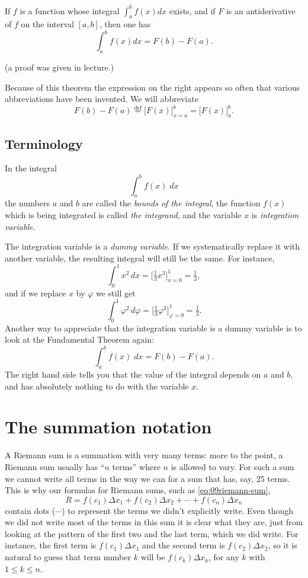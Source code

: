 \begin{theorem}
  If $f$ is a function whose integral $\int_a^b f(x) dx$ exists, and if
  $F$ is an antiderivative of $f$ on the interval $[a,b]$, then one has
  \begin{equation}
    \label{eq:fundamental-theorem}
    \int_a^b f(x) dx = F(b) - F(a).
  \end{equation}
\end{theorem}
(a proof was given in lecture.)

Because of this theorem the expression on the right appears so often
that various abbreviations have been invented.  We will abbreviate
\[
F(b)-F(a) \stackrel{\text{def}}{=} \bigl[F(x)\bigr]_{x=a}^b =
\bigl[F(x)\bigr]_a^b .
\]

\subsection{Terminology}\label{sec:08terminology}
In the integral
\[
\int_a^b f(x)\;dx
\]
the numbers $a$ and $b$ are called the \textit{bounds of the integral}, the
function $f(x)$ which is being integrated is called \textit{the integrand}, and
the variable $x$ is \textit{integration variable.}

The integration variable is a \textit{dummy variable}.  If we
systematically replace it with another variable, the resulting
integral will still be the same. For instance,
\[
\int_0^1 x^2\,dx = \bigl[\tfrac13 x^3\bigr]_{x=0}^1 = \tfrac13,
\]
and if we replace $x$ by $\varphi$ we still get
\[
\int_0^1 \varphi^2\, d\varphi
= \bigl[\tfrac13 \varphi^3\bigr]_{\varphi=0}^1 = \tfrac13.
\]
Another way to appreciate that the integration variable is a dummy
variable is to look at the Fundamental Theorem again:
\[
\int_a^b f(x)\;dx = F(b) -F(a).
\]
The right hand side tells you that the value of the integral depends
on $a$ and $b$, and has absolutely nothing to do with the variable $x$.

\section{The summation notation}
\label{sec:09about-those-dots}
A Riemann sum is a summation with very many terms: more to the point, a Riemann
sum usually has ``$n$ terms'' where $n$ is allowed to vary.  For such a sum we
cannot write all terms in the way we can for a sum that has, say, 25 terms.
This is why our formulas for Riemann sums, such as \eqref{eq:09riemann-sum},
\[
  R = f(c_1)\Delta x_1 + f(c_2) \Delta x_2 + \cdots + f(c_n)\Delta x_n
\]
contain dots ($\cdots$) to represent the terms we didn't explicitly write.
Even though we did not write most of the terms in this sum it is clear what they
are, just from looking at the pattern of the first two and the last term, which
we did write.  For instance, the first term is $f(c_1)\Delta x_1$ and the second
term is $f(c_2)\Delta x_2$, so it is natural to guess that term number
$k$ will be $f(c_k)\Delta x_k$, for any $k$ with $1\leq k \leq n$.

